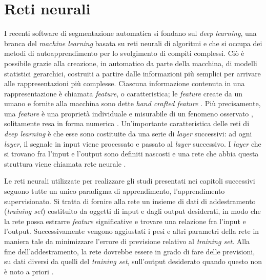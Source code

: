 \section{Reti neurali} \label{retineurali}
I recenti software di segmentazione automatica si fondano sul \textit{deep learning}, una branca del \textit{machine learning} basata su reti neurali di algoritmi e che si occupa dei metodi di autoapprendimento per lo svolgimento di compiti complessi. Ciò è possibile grazie alla creazione, in automatico da parte della macchina, di modelli statistici gerarchici, costruiti a partire dalle informazioni più semplici per arrivare alle rappresentazioni più complesse. Ciascuna informazione contenuta in una rappresentazione è chiamata \textit{feature}, o caratteristica; le \textit{feature} create da un umano e fornite alla macchina sono dette \textit{hand crafted feature} \cite[11]{LaRosa}. Più precisamente, una \textit{feature} è una proprietà individuale e misurabile di un fenomeno osservato \cite{bishop, wiki:feature}, solitamente resa in forma numerica \cite{wiki:feature}. Un'importante caratteristica delle reti di \textit{deep learning} è che esse sono costituite da una serie di \textit{layer} successivi: ad ogni \textit{layer}, il segnale in input viene processato e passato al \textit{layer} successivo. I \textit{layer} che si trovano fra l'input e l'output sono definiti nascosti e una rete che abbia questa struttura viene chiamata rete neurale \cite[12]{LaRosa}.

Le reti neurali utilizzate per realizzare gli studi presentati nei capitoli successivi seguono tutte un unico paradigma di apprendimento, l'apprendimento supervisionato. Si tratta di fornire alla rete un insieme di dati di addestramento (\textit{training set}) costituito da oggetti di input e dagli output desiderati, in modo che la rete possa estrarre \textit{feature} significative e trovare una relazione fra l'input e l'output. Successivamente vengono aggiustati i pesi e altri parametri della rete in maniera tale da minimizzare l'errore di previsione relativo al \textit{training set}. Alla fine dell'addestramento, la rete dovrebbe essere in grado di fare delle previsioni, su dati diversi da quelli del \textit{training set}, sull'output desiderato quando questo non è noto a priori \cite{wiki:rete}.


